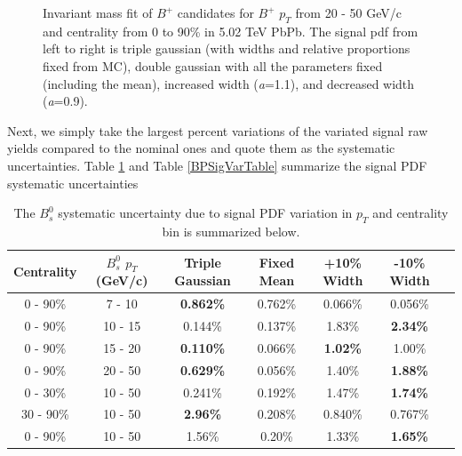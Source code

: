 \begin{figure}[hbtp]
\begin{center}
\caption{Invariant mass fit of $B^+$ candidates for $B^+$ $p_T$ from 20 - 50 GeV/c and centrality from 0 to 90\% in 5.02 TeV PbPb. The signal pdf from left to right is triple gaussian (with widths and relative proportions fixed from MC), double gaussian with all the parameters fixed (including the mean), increased width (\textit{a}=1.1), and decreased width (\textit{a}=0.9).}
\label{BPSigVar}
\end{center}
\end{figure}

Next, we simply take the largest percent variations of the variated signal raw yields compared to the nominal ones and quote them as the systematic uncertainties. Table \ref{BsSigVarTable} and Table \ref{BPSigVarTable} summarize the signal PDF systematic uncertainties 

\begin{table}[h]
\begin{center}
\caption{The $B^0_s$ systematic uncertainty due to signal PDF variation in $p_T$ and centrality bin is summarized below.}
\vspace{1em}
\label{BsSigVarTable}
  \begin{tabular}{| c | c |c | c| c| c| c| }
    \hline
     Centrality & $B^0_s$ $p_T$ (GeV/c) & Triple Gaussian &  Fixed Mean & +10\% Width & -10\% Width  \\
    \hline
    \hline
0 - 90\% & 7 - 10 &   \textbf{0.862\% }  &  0.762\% & 0.066\% &  0.056\% \\ 
0 - 90\% & 10 - 15 & 0.144\%  & 0.137\%  & 1.83\% &   \textbf{2.34\%}  \\ 
0 - 90\% & 15 - 20 &  \textbf{0.110\% }  & 0.066\%   &  \textbf{1.02\%} &  1.00\% \\ 
0 - 90\% & 20 - 50 &  \textbf{0.629\% }   & 0.056\%  &  1.40\%  &   \textbf{1.88\%}\\ 
0 - 30\% & 10 - 50  & 0.241\%  & 0.192\%  &1.47\% &  \textbf{1.74\%} \\ 
30 - 90\% & 10 - 50 &  \textbf{2.96\%} &   0.208\%  & 0.840\% &  0.767\%\\ 
0 - 90\% & 10 - 50 &  1.56\%   & 0.20\%  & 1.33\% &   \textbf{1.65\%} \\ 
    \hline
    \hline
\end{tabular}
\end{center}
\end{table}




